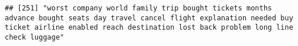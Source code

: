 \documentclass[
]{article}
\begin{document}
\begin{verbatim}
## [251] "worst company world family trip bought tickets months advance bought seats day travel cancel flight explanation needed buy ticket airline enabled reach destination lost back problem long line check luggage"                                                                                                                                                                                                                                                                                                                                                                                                                                                                                                                                                                                                                                                                                                                                                                                                                                                                                                                                                                                                                                                                                                                                                                                                                                                                                                                                                                                                                                                                                                                                                                                 

\end{verbatim}
\end{document}

